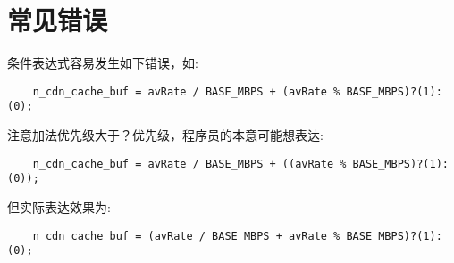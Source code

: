\section{常见错误}

条件表达式容易发生如下错误，如:
\begin{verbatim}
    n_cdn_cache_buf = avRate / BASE_MBPS + (avRate % BASE_MBPS)?(1):(0);
\end{verbatim}
注意加法优先级大于？优先级，程序员的本意可能想表达:
\begin{verbatim}
    n_cdn_cache_buf = avRate / BASE_MBPS + ((avRate % BASE_MBPS)?(1):(0));
\end{verbatim}
但实际表达效果为:

\begin{verbatim}
    n_cdn_cache_buf = (avRate / BASE_MBPS + avRate % BASE_MBPS)?(1):(0);
\end{verbatim}


